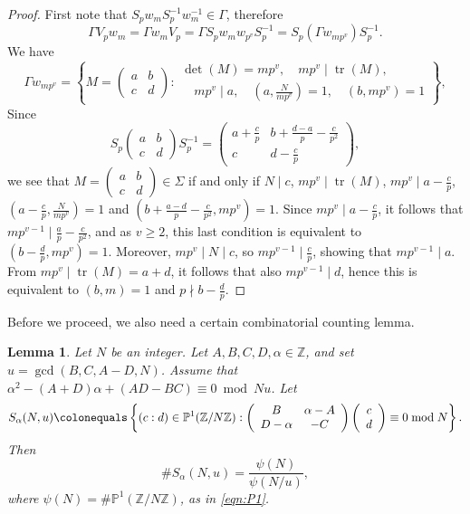 \documentclass[12pt]{amsart}
\renewcommand{\P}{\mathbb{P}}
\newcommand{\Z}{\mathbb{Z}}
\DeclareMathOperator{\tr}{tr}
\numberwithin{equation}{subsection}
\theoremstyle{plain}\newtheorem{ithm}{Theorem}
\theoremstyle{plain}\newtheorem{iprop}[ithm]{Proposition}
\newtheorem{lemma}[equation]{Lemma}
\theoremstyle{definition}
\theoremstyle{remark}
\newcommand{\mattwo}[4]{\left( \begin{array}{cc} {#1} & {#2} \\ {#3} & {#4} \end{array} \right)}
\newcommand{\vectwo}[2]{\left( \begin{array}{c} {#1} \\ {#2} \end{array} \right)}
\begin{document}
\begin{proof}
    First note that $S_p w_m S_p^{-1} w_m^{-1} \in \Gamma$, therefore
    $$
    \Gamma V_p w_m = \Gamma w_m V_p = \Gamma S_p w_m w_{p^v} S_p^{-1} = S_p (\Gamma w_{m p^v})S_p^{-1}.
    $$
    We have
    \begin{equation}
        \Gamma w_{mp^v} = \left \{
            M = \mattwo{a}{b}{c}{d} : \begin{array}{c} \det(M) = mp^v, \quad mp^v \mid \tr(M), \\ 
            \quad m p^v \mid a, \quad (a, \tfrac{N}{mp^v}) = 1, \quad (b, mp^v) = 1 \end{array}
        \right \},
    \end{equation}
    Since 
    $$
    S_p \mattwo{a}{b}{c}{d} S_p^{-1} = \mattwo{a + \frac{c}{p}}{b + \frac{d-a}{p} - \frac{c}{p^2}}{c}{d - \frac{c}{p}},
    $$
    we see that $M = \mattwo{a}{b}{c}{d} \in \Sigma$ if and only if $N \mid c$, $mp^v \mid \tr(M)$, $mp^v \mid a - \frac{c}{p}$, $\left(a - \frac{c}{p}, \frac{N}{mp^v} \right) = 1$ and $\left(b + \frac{a-d}{p} - \frac{c}{p^2}, mp^v \right) = 1$.
    Since $mp^v \mid a - \frac{c}{p}$, it follows that $mp^{v-1} \mid \frac{a}{p} - \frac{c}{p^2}$, and as $v \ge 2$, this last condition is equivalent to $\left(b - \frac{d}{p}, mp^v \right) = 1$. Moreover, $mp^{v} \mid N \mid c$, so $mp^{v-1} \mid \frac{c}{p}$, showing that $mp^{v-1} \mid a$. From $mp^v \mid \tr(M) = a + d$, it follows that also $mp^{v-1} \mid d$, hence this is equivalent to $(b,m) = 1$ and $p \nmid b - \frac{d}{p}$. 
    \end{proof}

Before we proceed, we also need a certain combinatorial counting lemma. 

\begin{lemma}
    Let $N$ be an integer. Let $A, B, C, D, \alpha \in \Z$, and set $u = \gcd(B,C,A-D,N)$.
    Assume that $\alpha^2 - (A + D) \alpha + (AD-BC) \equiv 0 \bmod Nu$.
    Let 
    \begin{equation} \label{eq: linear system mod N}
    S_{\alpha}(N,u) \colonequals \left \{
    (c:d) \in \P^1(\Z / N \Z) : 
    \mattwo{B}{\alpha - A}{D - \alpha}{-C}
    \vectwo{c}{d} \equiv 0 \bmod N
    \right \}.
    \end{equation}
    Then $$ \# S_{\alpha}(N,u) =  \frac{\psi(N)}{\psi(N/u)}, $$
    where $\psi(N) = \# \P^1( \Z / N \Z)$, as in \eqref{eqn:P1}.
\end{lemma}
\end{document}

